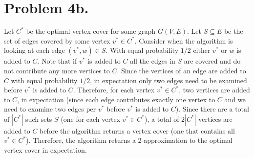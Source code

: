 \documentclass[12pt]{article}
\begin{document}
\section*{Problem 4b.}
Let $C^*$ be the optimal vertex cover for some graph $G(V,E)$. Let
$S \subseteq E$ be the set of edges covered by some vertex $v^* \in C^*$.
Consider when the algorithm is looking at each edge $(v^*,w) \in S$. With equal
probability $1/2$ either $v^*$ or $w$ is added to $C$. Note that if $v^*$ is
added to $C$ all the edges in $S$ are covered and do not contribute any more
vertices to $C$. Since the vertices of an edge are added to $C$ with equal
probability $1/2$, in expectation only two edges need to be examined before
$v^*$ is added to $C$. Therefore, for each vertex $v^* \in C^*$, two vertices
are added to $C$, in expectation (since each edge contributes exactly one vertex
to $C$ and we need to examine two edges per $v^*$ before $v^*$ is added to $C$).
Since there are a total of $|C^*|$ such sets $S$ (one for each vertex
$v^* \in C^*$), a total of $2|C^*|$ vertices are added to $C$ before the
algorithm returns a vertex cover (one that contains all $v^* \in C^*$).
Therefore, the algorithm returns a 2-approximation to the optimal vertex cover
in expectation.
\end{document}

